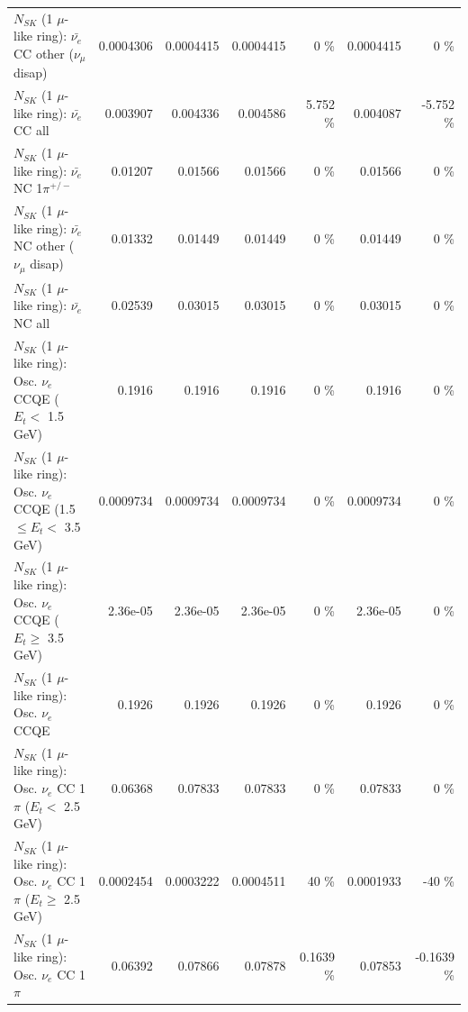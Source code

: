 \begin{table}
\begin{tabular}{| l | r | r | r  r | r  r |}
          $N_{SK}$ (1 $\mu$-like ring): $\bar{\nu_e}$ CC other ($\nu_\mu$ disap) &       0.0004306 &       0.0004415 &       0.0004415 &        0 \%  &       0.0004415 &        0 \%  \\ 
                            $N_{SK}$ (1 $\mu$-like ring): $\bar{\nu_{e}}$ CC all &        0.003907 &        0.004336 &        0.004586 &    5.752 \%  &        0.004087 &   -5.752 \%  \\ 
\hline
                     $N_{SK}$ (1 $\mu$-like ring): $\bar{\nu_e}$ NC 1$\pi^{+/-}$ &         0.01207 &         0.01566 &         0.01566 &        0 \%  &         0.01566 &        0 \%  \\ 
          $N_{SK}$ (1 $\mu$-like ring): $\bar{\nu_e}$ NC other ($\nu_\mu$ disap) &         0.01332 &         0.01449 &         0.01449 &        0 \%  &         0.01449 &        0 \%  \\ 
                            $N_{SK}$ (1 $\mu$-like ring): $\bar{\nu_{e}}$ NC all &         0.02539 &         0.03015 &         0.03015 &        0 \%  &         0.03015 &        0 \%  \\ 
\hline
\hline
\hline
             $N_{SK}$ (1 $\mu$-like ring): Osc. $\nu_e$ CCQE ($E_{t} <$ 1.5 GeV) &          0.1916 &          0.1916 &          0.1916 &        0 \%  &          0.1916 &        0 \%  \\ 
    $N_{SK}$ (1 $\mu$-like ring): Osc. $\nu_e$ CCQE (1.5 $\leq E_{t} <$ 3.5 GeV) &       0.0009734 &       0.0009734 &       0.0009734 &        0 \%  &       0.0009734 &        0 \%  \\ 
          $N_{SK}$ (1 $\mu$-like ring): Osc. $\nu_e$ CCQE ($E_{t} \geq$ 3.5 GeV) &        2.36e-05 &        2.36e-05 &        2.36e-05 &        0 \%  &        2.36e-05 &        0 \%  \\ 
\hline
                                 $N_{SK}$ (1 $\mu$-like ring): Osc. $\nu_e$ CCQE &          0.1926 &          0.1926 &          0.1926 &        0 \%  &          0.1926 &        0 \%  \\ 
\hline
        $N_{SK}$ (1 $\mu$-like ring): Osc. $\nu_e$ CC 1$\pi$ ($E_{t} <$ 2.5 GeV) &         0.06368 &         0.07833 &         0.07833 &        0 \%  &         0.07833 &        0 \%  \\ 
     $N_{SK}$ (1 $\mu$-like ring): Osc. $\nu_e$ CC 1$\pi$ ($E_{t} \geq$ 2.5 GeV) &       0.0002454 &       0.0003222 &       0.0004511 &       40 \%  &       0.0001933 &      -40 \%  \\ 
\hline
                            $N_{SK}$ (1 $\mu$-like ring): Osc. $\nu_e$ CC 1$\pi$ &         0.06392 &         0.07866 &         0.07878 &   0.1639 \%  &         0.07853 &  -0.1639 \%  \\ 

\end{tabular}
\end{table}
